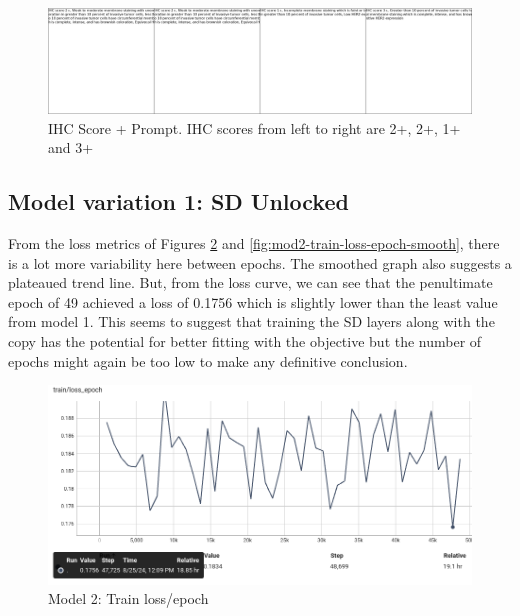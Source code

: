 \begin{figure}[H]
    \centering
    \includegraphics[width=1\linewidth]{5_Results/figures/conditioning_gs-020380_e-000020_b-000900.png}
    \caption[Input prompts for train log at e=20, steps=900]{IHC Score + Prompt. IHC scores from left to right are 2+, 2+, 1+ and 3+}
    \label{fig:train-log-prompt-e20-s900}
\end{figure}

\subsection{Model variation 1: SD Unlocked}

From the loss metrics of Figures \ref{fig:mod2-train-loss-epoch} and \ref{fig:mod2-train-loss-epoch-smooth}, there is a lot more variability here between epochs. The smoothed graph also suggests a plateaued trend line. But, from the loss curve, we can see that the penultimate epoch of 49 achieved a loss of 0.1756 which is slightly lower than the least value from model 1. This seems to suggest that training the SD layers along with the copy has the potential for better fitting with the objective but the number of epochs might again be too low to make any definitive conclusion.

\begin{figure}[ht]
    \centering
    \includegraphics[width=1\linewidth]{5_Results/figures/sd2-train-loss-epoch.png}
    \caption{Model 2: Train loss/epoch}
    \label{fig:mod2-train-loss-epoch}
\end{figure}

